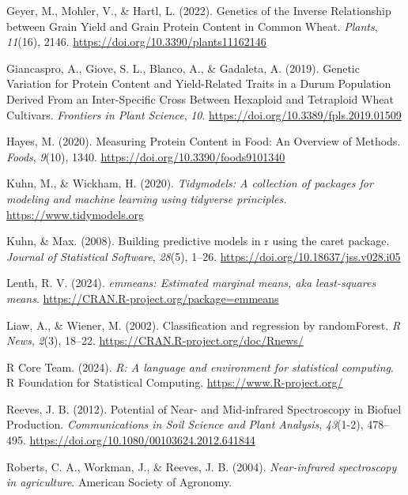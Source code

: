 \documentclass[
]{agujournal2019}
\newlength{\cslhangindent}
\newenvironment{CSLReferences}[2] %
 {\begin{list}{}{%
  \setlength{\itemindent}{0pt}
  \setlength{\leftmargin}{0pt}
  \setlength{\parsep}{0pt}
  \ifodd #1
   \setlength{\leftmargin}{\cslhangindent}
   \setlength{\itemindent}{-1\cslhangindent}
  \fi
  \setlength{\itemsep}{#2\baselineskip}}}
 {\end{list}}
\begin{document}
\begin{CSLReferences}{1}{0}
Geyer, M., Mohler, V., \& Hartl, L. (2022). Genetics of the {Inverse}
{Relationship} between {Grain} {Yield} and {Grain} {Protein} {Content}
in {Common} {Wheat}. \emph{Plants}, \emph{11}(16), 2146.
\url{https://doi.org/10.3390/plants11162146}

Giancaspro, A., Giove, S. L., Blanco, A., \& Gadaleta, A. (2019).
Genetic {Variation} for {Protein} {Content} and {Yield}-{Related}
{Traits} in a {Durum} {Population} {Derived} {From} an
{Inter}-{Specific} {Cross} {Between} {Hexaploid} and {Tetraploid}
{Wheat} {Cultivars}. \emph{Frontiers in Plant Science}, \emph{10}.
\url{https://doi.org/10.3389/fpls.2019.01509}

Hayes, M. (2020). Measuring {Protein} {Content} in {Food}: {An}
{Overview} of {Methods}. \emph{Foods}, \emph{9}(10), 1340.
\url{https://doi.org/10.3390/foods9101340}

Kuhn, M., \& Wickham, H. (2020). \emph{{Tidymodels}: A collection of
packages for modeling and machine learning using tidyverse principles.}
\url{https://www.tidymodels.org}

Kuhn, \& Max. (2008). Building predictive models in r using the caret
package. \emph{Journal of Statistical Software}, \emph{28}(5), 1--26.
\url{https://doi.org/10.18637/jss.v028.i05}

Lenth, R. V. (2024). \emph{{emmeans}: Estimated marginal means, aka
least-squares means}. \url{https://CRAN.R-project.org/package=emmeans}

Liaw, A., \& Wiener, M. (2002). Classification and regression by
randomForest. \emph{R News}, \emph{2}(3), 18--22.
\url{https://CRAN.R-project.org/doc/Rnews/}

R Core Team. (2024). \emph{{R}: A language and environment for
statistical computing}. R Foundation for Statistical Computing.
\url{https://www.R-project.org/}

Reeves, J. B. (2012). Potential of {Near}- and {Mid}-infrared
{Spectroscopy} in {Biofuel} {Production}. \emph{Communications in Soil
Science and Plant Analysis}, \emph{43}(1-2), 478--495.
\url{https://doi.org/10.1080/00103624.2012.641844}

Roberts, C. A., Workman, J., \& Reeves, J. B. (2004).
\emph{Near-infrared spectroscopy in agriculture}. American Society of
Agronomy.


\end{CSLReferences}
\end{document}

